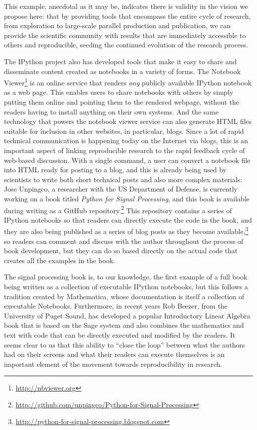 \documentclass[ChapterTOCs,krantz2]{krantz} %
\begin{document}
This example, anecdotal as it may be, indicates there is validity in the vision
we propose here: that by providing tools that encompass the entire cycle of
research, from exploration to large-scale parallel production and publication,
we can provide the scientific community with results that are immediately
accessible to others and reproducible, seeding the continued evolution of the
research process.

The IPython project also has developed tools that make it easy to share
and disseminate content created as notebooks in a variety of forms.  The
Notebook Viewer\footnote{\url{http://nbviewer.org}} is an online service that
renders \emph{any} publicly available IPython notebook as a web page.  This
enables users to share notebooks with others by simply putting them online and
pointing them to the rendered webpage, without the readers having to install
anything on their own systems.  And the same technology that powers the
notebook viewer service can also generate HTML files suitable for inclusion in
other websites, in particular, blogs.  Since a lot of rapid technical
communication is happening today on the Internet via blogs, this is an
important aspect of linking reproducible research to the rapid feedback cycle
of web-based discussion.  With a single command, a user can convert a notebook
file into HTML ready for posting to a blog, and this is already being used by
scientists to write both short technical posts and also more complex materials:
Jose Unpingco, a researcher with the US Department of Defense, is currently
working on a book titled \emph{Python for Signal Processing}, and this book is
available during writing as a GitHub
repository.\footnote{\url{http://github.com/unpingco/Python-for-Signal-Processing}}
This repository contains a series of IPython notebooks so that readers can
directly execute the code in the book, and they are also being published as a
series of blog posts as they become
available,\footnote{\url{http://python-for-signal-processing.blogspot.com}} so
readers can comment and discuss with the author throughout the process of book
development, but they can do so based directly on the actual code that creates
all the examples in the book.

The signal processing book is, to our knowledge, the first example of a full
book being written as a collection of executable IPython notebooks, but this
follows a tradition created by Mathematica, whose documentation is itself a
collection of executable Notebooks.  Furthermore, in recent years Rob Beezer,
from the University of Puget Sound, has developed a popular Introductory Linear
Algebra book \cite{beezer2009first} that is based on the Sage system and
also combines the mathematics and text with code that can be directly executed
and modified by the readers.  It seems clear to us that this ability to ``close
the loop'' between what the authors had on their screens and what their readers
can execute themselves is an important element of the movement towards
reproducibility in research.
\end{document}
